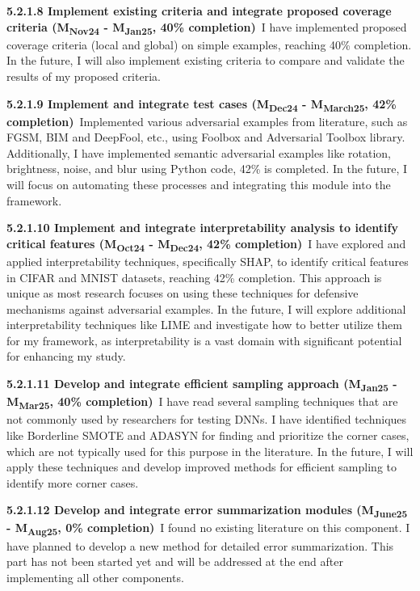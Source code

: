 \noindent \textbf{5.2.1.8 Implement existing criteria and integrate proposed coverage criteria (M\textsubscript{Nov24} - M\textsubscript{Jan25}, 40\% completion)}\ I have implemented proposed coverage criteria (local and global) on simple examples, reaching 40\% completion. In the future, I will also implement existing criteria to compare and validate the results of my proposed criteria.

\noindent \textbf{5.2.1.9 Implement and integrate test cases (M\textsubscript{Dec24} - M\textsubscript{March25}, 42\% completion)}\ Implemented various adversarial examples from literature, such as FGSM, BIM and DeepFool, etc., using Foolbox and Adversarial Toolbox library. Additionally, I have implemented semantic adversarial examples like rotation, brightness, noise, and blur using Python code, 42\% is completed. In the future, I will focus on automating these processes and integrating this module into the framework.

\noindent \textbf{5.2.1.10 Implement and integrate interpretability analysis to identify critical features (M\textsubscript{Oct24} - M\textsubscript{Dec24}, 42\% completion)}\ I have explored and applied interpretability techniques, specifically SHAP, to identify critical features in CIFAR and MNIST datasets, reaching 42\% completion. This approach is unique as most research focuses on using these techniques for defensive mechanisms against adversarial examples. In the future, I will explore additional interpretability techniques like LIME and investigate how to better utilize them for my framework, as interpretability is a vast domain with significant potential for enhancing my study.

\noindent \textbf{5.2.1.11 Develop and integrate efficient sampling approach (M\textsubscript{Jan25} - M\textsubscript{Mar25}, 40\% completion)}\ I have read several sampling techniques that are not commonly used by researchers for testing DNNs. I have identified techniques like Borderline SMOTE and ADASYN for finding and prioritize the corner cases, which are not typically used for this purpose in the literature. In the future, I will apply these techniques and develop improved methods for efficient sampling to identify more corner cases.

\noindent \textbf{5.2.1.12 Develop and integrate error summarization modules (M\textsubscript{June25} - M\textsubscript{Aug25}, 0\% completion)}\ I found no existing literature on this component. I have planned to develop a new method for detailed error summarization. This part has not been started yet and will be addressed at the end after implementing all other components.

